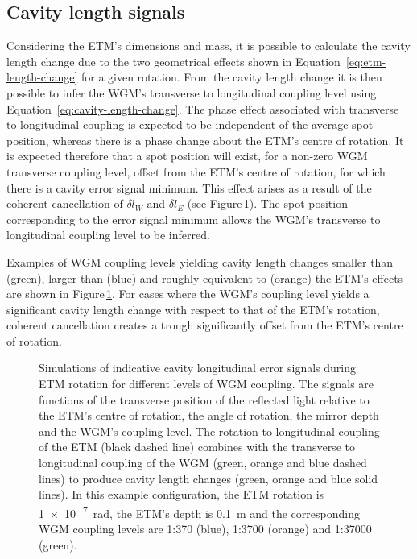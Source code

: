 \subsection{Cavity length signals}
Considering the \gls{ETM}'s dimensions and mass, it is possible to calculate the cavity length change due to the two geometrical effects shown in Equation~\ref{eq:etm-length-change} for a given rotation. From the cavity length change it is then possible to infer the \gls{WGM}'s transverse to longitudinal coupling level using Equation~\ref{eq:cavity-length-change}. The phase effect associated with transverse to longitudinal coupling is expected to be independent of the average spot position, whereas there is a phase change about the \gls{ETM}'s centre of rotation. It is expected therefore that a spot position will exist, for a non-zero \gls{WGM} transverse coupling level, offset from the \gls{ETM}'s centre of rotation, for which there is a cavity error signal minimum. This effect arises as a result of the coherent cancellation of $\delta l_W$ and $\delta l_{E}$ (see Figure\,\ref{fig:coupling-contributions}). The spot position corresponding to the error signal minimum allows the \gls{WGM}'s transverse to longitudinal coupling level to be inferred.

Examples of \gls{WGM} coupling levels yielding cavity length changes smaller than (green), larger than (blue) and roughly equivalent to (orange) the \gls{ETM}'s effects are shown in Figure\,\ref{fig:coupling-contributions}. For cases where the \gls{WGM}'s coupling level yields a significant cavity length change with respect to that of the \gls{ETM}'s rotation, coherent cancellation creates a trough significantly offset from the \gls{ETM}'s centre of rotation.

\begin{figure}
  \centering
  
  \caption[Simulations of indicative cavity longitudinal error signals during end test mass rotation for different levels of waveguide mirror coupling]{\label{fig:coupling-contributions}Simulations of indicative cavity longitudinal error signals during \gls{ETM} rotation for different levels of \gls{WGM} coupling. The signals are functions of the transverse position of the reflected light relative to the \gls{ETM}'s centre of rotation, the angle of rotation, the mirror depth and the \gls{WGM}'s coupling level. The rotation to longitudinal coupling of the \gls{ETM} (black dashed line) combines with the transverse to longitudinal coupling of the \gls{WGM} (green, orange and blue dashed lines) to produce cavity length changes (green, orange and blue solid lines). In this example configuration, the \gls{ETM} rotation is \SI{1e-7}{\radian}, the \gls{ETM}'s depth is \SI{0.1}{\meter} and the corresponding \gls{WGM} coupling levels are 1:370 (blue), 1:3700 (orange) and 1:37000 (green).}
\end{figure}

